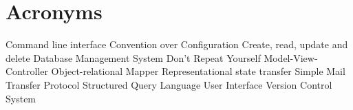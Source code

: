 \newpage
\section*{Acronyms}
\begin{acronym}
	  {Command line interface}
	  {Convention over Configuration}
	 {Create, read, update and delete}
	 {Database Management System}
	  {Don't Repeat Yourself}
	  {Model-View-Controller}
	  {Object-relational Mapper}
	 {Representational state transfer}
	 {Simple Mail Transfer Protocol}
	  {Structured Query Language}
		{User Interface}
		{Version Control System}
\end{acronym}
